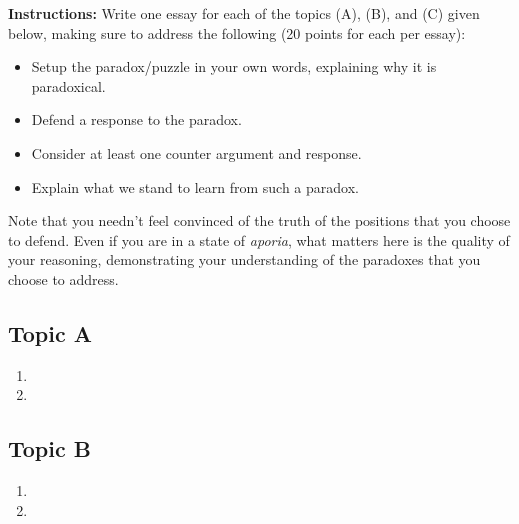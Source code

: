 \documentclass[12pt,letterpaper]{article}
\begin{document}

\vspace{.2in}

\noindent
\textbf{Instructions:} 
Write one essay for each of the topics (A), (B), and (C) given below, making sure to address the following (20 points for each per essay):
\begin{itemize}
  \item Setup the paradox/puzzle in your own words, explaining why it is paradoxical.
  \item Defend a response to the paradox.
  \item Consider at least one counter argument and response.
  \item Explain what we stand to learn from such a paradox.
\end{itemize}
Note that you needn't feel convinced of the truth of the positions that you choose to defend.
Even if you are in a state of \textit{aporia}, what matters here is the quality of your reasoning, demonstrating your understanding of the paradoxes that you choose to address.

\vspace{.2in}



\subsection*{Topic A}

\begin{enumerate}
  \item 
    \answer{
    }
  \item 
    \answer{
    }
\end{enumerate}




\subsection*{Topic B}

\begin{enumerate}
  \item 
    \answer{
    }
  \item 
    \answer{
    }
\end{enumerate}
\end{document}
